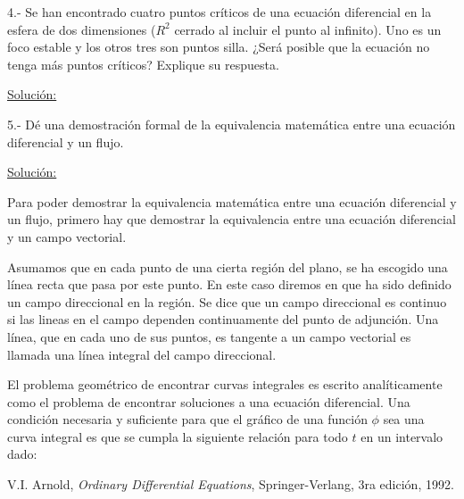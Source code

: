 \documentclass[a4paper,10pt]{article}
\begin{document}
\newpage

4.- Se han encontrado cuatro puntos críticos de una ecuación diferencial en la esfera
de dos dimensiones ($R^2$ cerrado al incluir el punto al infinito). Uno es un foco
estable y los otros tres son puntos silla. ¿Será posible que la ecuación no tenga
más puntos críticos? Explique su respuesta.


\vspace{.3cm}

\underline{Solución:}

\vspace{.3cm}

5.- Dé una demostración formal de la equivalencia matemática entre una ecuación
diferencial y un flujo.

\vspace{.3cm}

\underline{Solución:}\vspace{.3cm}

Para poder demostrar la equivalencia matemática entre una ecuación diferencial y un flujo,
primero hay que demostrar la equivalencia entre una ecuación diferencial y un campo vectorial.

\vspace{.3cm}

Asumamos que en cada punto de una cierta región del plano, se ha escogido una línea
recta que pasa por este punto. En este caso diremos en que ha sido definido un campo
direccional en la región. Se dice que un campo direccional es continuo si las lineas
en el campo dependen continuamente del punto de adjunción. Una línea, que en cada uno
de sus puntos, es tangente a un campo vectorial es llamada una línea integral del
campo direccional.

\vspace{.3cm}

El problema geométrico de encontrar curvas integrales es escrito analíticamente como el
problema de encontrar soluciones a una ecuación diferencial. Una condición necesaria 
y suficiente para que el gráfico de una función $\phi$ sea una curva integral 
es que se cumpla la siguiente relación para todo $t$ en un intervalo dado:


\vspace{.3cm}


\begin{thebibliography}{10}
 V.I. Arnold, \emph{Ordinary Differential Equations}, Springer-Verlang,
 3ra edición, 1992.
\end{thebibliography}
\end{document}
